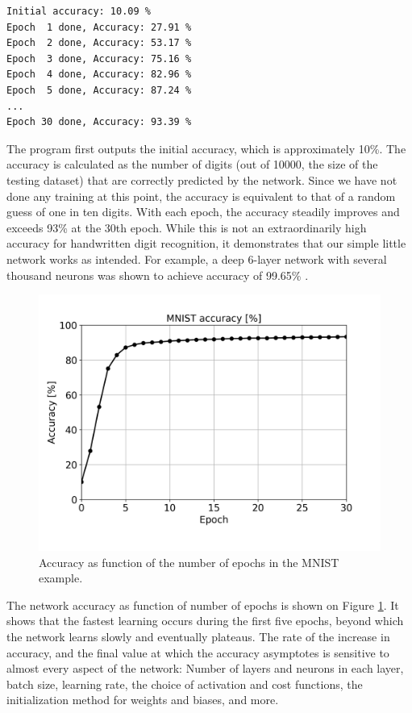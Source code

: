 \documentclass[sigplan, review=false, screen=true, balance=true]{acmart}
\begin{document}
\begin{lstlisting}[caption={Output from the MNIST training example program. Some lines omitted for brevity.}, captionpos=b]
Initial accuracy: 10.09 %
Epoch  1 done, Accuracy: 27.91 %
Epoch  2 done, Accuracy: 53.17 %
Epoch  3 done, Accuracy: 75.16 %
Epoch  4 done, Accuracy: 82.96 %
Epoch  5 done, Accuracy: 87.24 %
...
Epoch 30 done, Accuracy: 93.39 %
\end{lstlisting}

The program first outputs the initial accuracy, which is approximately 10\%.
The accuracy is calculated as the number of digits (out of 10000, the size
of the testing dataset) that are correctly predicted by the network.
Since we have not done any training at this point, the accuracy is equivalent
to that of a random guess of one in ten digits. With each epoch, the accuracy
steadily improves and exceeds 93\% at the 30th epoch. While this is not an
extraordinarily high accuracy for handwritten digit recognition, it demonstrates
that our simple little network works as intended. For example, a deep 6-layer
network with several thousand neurons was shown to achieve accuracy of
99.65\% \citep{ciresan10}.

\begin{figure}[H]
  \centering
  \includegraphics[width=\columnwidth]{../figures/mnist_accuracy.png}
  \caption{Accuracy as function of the number of epochs in the MNIST example.}
  \label{fig_mnist_accuracy}
\end{figure}

The network accuracy as function of number of epochs is shown on Figure
\ref{fig_mnist_accuracy}. It shows that the fastest learning occurs during
the first five epochs, beyond which the network learns slowly and eventually
plateaus.
The rate of the increase in accuracy, and the final value at which the accuracy
asymptotes is sensitive to almost every aspect of the network:
Number of layers and neurons in each layer, batch size,
learning rate, the choice of activation and cost functions, the initialization
method for weights and biases, and more.
\end{document}
